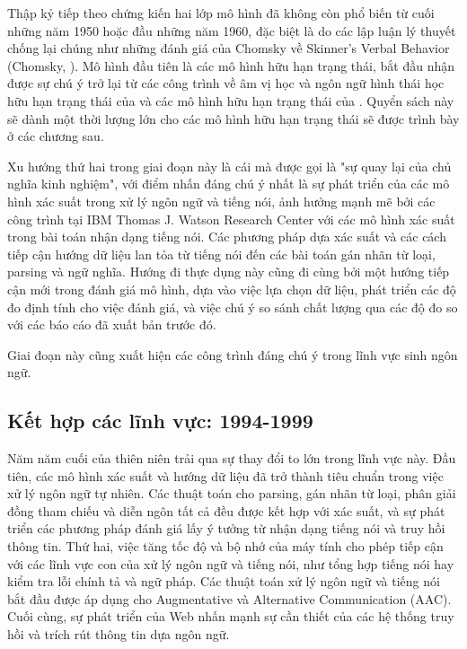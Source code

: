 Thập kỷ tiếp theo chứng kiến hai lớp mô hình đã không còn phổ biến từ cuối những năm 1950 hoặc đầu những năm 1960, đặc biệt là do các lập luận lý thuyết chống lại chúng như những đánh giá của Chomsky về Skinner's Verbal Behavior (Chomsky, \citeyear{cogprints1148}). Mô hình đầu tiên là các mô hình hữu hạn trạng thái, bắt đầu nhận được sự chú ý trở lại từ các công trình về âm vị học và ngôn ngữ hình thái học hữu hạn trạng thái của \citet{kaplan1981phonological} và các mô hình hữu hạn trạng thái của \citet{church1980memory}. Quyển sách này sẽ dành một thời lượng lớn cho các mô hình hữu hạn trạng thái sẽ được trình bày ở các chương sau.

Xu hướng thứ hai trong giai đoạn này là cái mà được gọi là "sự quay lại của chủ nghĩa kinh nghiệm", với điểm nhấn đáng chú ý nhất là sự phát triển của các mô hình xác suất trong xử lý ngôn ngữ và tiếng nói, ảnh hưởng mạnh mẽ bởi các công trình tại IBM Thomas J. Watson Research Center với các mô hình xác suất trong bài toán nhận dạng tiếng nói. Các phương pháp dựa xác suất và các cách tiếp cận hướng dữ liệu lan tỏa từ tiếng nói đến các bài toán gán nhãn từ loại, parsing và ngữ nghĩa. Hướng đi thực dụng này cũng đi cùng bởi một hướng tiếp cận mới trong đánh giá mô hình, dựa vào việc lựa chọn dữ liệu, phát triển các độ đo định tính cho việc đánh giá, và việc chú ý so sánh chất lượng qua các độ đo so với các báo cáo đã xuất bản trước đó.

Giai đoạn này cũng xuất hiện các công trình đáng chú ý trong lĩnh vực sinh ngôn ngữ.

\subsection{Kết hợp các lĩnh vực: 1994-1999}

Năm năm cuối của thiên niên trải qua sự thay đổi to lớn trong lĩnh vực này. Đầu tiên, các mô hình xác suất và hướng dữ liệu đã trở thành tiêu chuẩn trong việc xử lý ngôn ngữ tự nhiên. Các thuật toán cho parsing, gán nhãn từ loại, phân giải đồng tham chiếu và diễn ngôn tất cả đều được kết hợp với xác suất, và sự phát triển các phương pháp đánh giá lấy ý tưởng từ nhận dạng tiếng nói và truy hồi thông tin. Thứ hai, việc tăng tốc độ và bộ nhớ của máy tính cho phép tiếp cận với các lĩnh vực con của xử lý ngôn ngữ và tiếng nói, như tổng hợp tiếng nói hay kiểm tra lỗi chính tả và ngữ pháp. Các thuật toán xử lý ngôn ngữ và tiếng nói bắt đầu được áp dụng cho Augmentative và Alternative Communication (AAC). Cuối cùng, sự phát triển của Web nhấn mạnh sự cần thiết của các hệ thống truy hồi và trích rút thông tin dựa ngôn ngữ.

